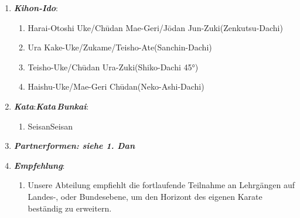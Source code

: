 	\begin{enumerate}[nosep]
		\item \textit{\textbf{Kihon-Ido}}:
		\begin{enumerate}[nosep]
			\item Harai-Otoshi	Uke/Ch\={u}dan Mae-Geri/J\={o}dan Jun-Zuki\tabto{335pt}(Zenkutsu-Dachi)
			\item Ura Kake-Uke/Zukame/Teisho-Ate\tabto{335pt}(Sanchin-Dachi)
			\item Teisho-Uke/Ch\={u}dan Ura-Zuki\tabto{335pt}(Shiko-Dachi 45°)
			\item Haishu-Uke/Mae-Geri Ch\={u}dan\tabto{335pt}(Neko-Ashi-Dachi)
		\end{enumerate}
		\vspace{12pt}
		\item \textit{\textbf{Kata}}:\tabto{200pt}\textit{\textbf{Kata\,Bunkai}}:
		\begin{enumerate}[nosep]
			\item Seisan\tabto{200pt}Seisan
		\end{enumerate}
		\vspace{12pt}
		\item \textit{\textbf{Partnerformen: siehe 1. Dan}}
		\vspace{12pt}
	\item \textit{\textbf{Empfehlung}}:
	\begin{enumerate}[nosep]
		\item[] Unsere Abteilung empfiehlt die fortlaufende Teilnahme an Lehrgängen auf Landes-, oder Bundesebene, um den Horizont des eigenen Karate beständig zu erweitern.
	\end{enumerate}
	\end{enumerate}